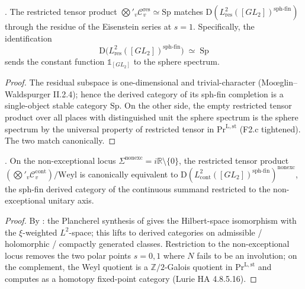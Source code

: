 \begin{theorem}
\label{v4-arith:w6-d:thm:res-lift}
\ClaimStatusProvedHere. The restricted tensor product
\(\bigotimes'_{v}\mathcal{C}^{\mathrm{res}}_{v}\simeq\mathrm{Sp}\)
matches \(\mathrm{D}(L^{2}_{\mathrm{res}}([GL_{2}])^{\mathrm{sph\text{-}fin}})\)
through the residue of the Eisenstein series at \(s=1\). Specifically,
the identification
\begin{equation}
\mathrm{D}\bigl(L^{2}_{\mathrm{res}}([GL_{2}])^{\mathrm{sph\text{-}fin}}\bigr)\;\simeq\;\mathrm{Sp}
\end{equation}
sends the constant function \(\mathbb{1}_{[GL_{2}]}\) to the sphere
spectrum.
\end{theorem}

\begin{proof}
The residual subspace is one-dimensional and trivial-character
(Mo{\oe}glin--Waldspurger II.2.4); hence the derived category of
its sph-fin completion is a single-object stable category
\(\mathrm{Sp}\). On the other side, the empty restricted tensor
product over all places with distinguished unit the sphere spectrum
is the sphere spectrum by the universal property of restricted
tensor in \(\mathrm{Pr}^{\mathrm{L,st}}\) (F2.c tightened). The two
match canonically.
\end{proof}

\begin{theorem}
\label{v4-arith:w6-d:thm:cont-lift}
\ClaimStatusProvedHere. On the non-exceptional locus
\(\Sigma^{\mathrm{nonexc}}=i\mathbb{R}\setminus\{0\}\), the restricted
tensor product
\((\bigotimes'_{v}\mathcal{C}^{\mathrm{cont}}_{v})/\mathrm{Weyl}\)
is canonically equivalent to
\(\mathrm{D}(L^{2}_{\mathrm{cont}}([GL_{2}])^{\mathrm{sph\text{-}fin}})^{\mathrm{nonexc}}\),
the sph-fin derived category of the continuous summand restricted
to the non-exceptional unitary axis.
\end{theorem}

\begin{proof}
By : the Plancherel synthesis of
 gives the Hilbert-space isomorphism
with the \(\xi\)-weighted \(L^{2}\)-space; this lifts to derived categories on
admissible / holomorphic / compactly generated classes. Restriction
to the non-exceptional locus removes the two polar points \(s=0,1\)
where \(N\) fails to be an involution; on the complement, the Weyl
quotient is a \(\mathbb{Z}/2\)-Galois quotient in
\(\mathrm{Pr}^{\mathrm{L,st}}\) and computes as a homotopy
fixed-point category (Lurie HA 4.8.5.16).
\end{proof}

